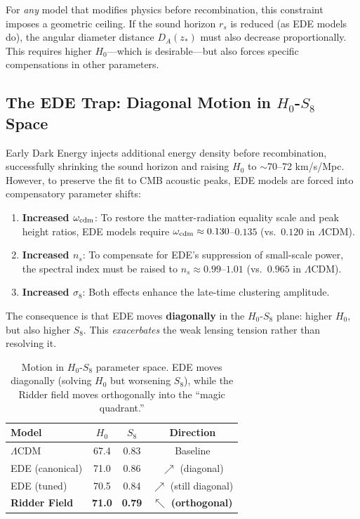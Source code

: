 \documentclass[twocolumn,showpacs,preprintnumbers,amsmath,amssymb,prd]{revtex4-2}
\begin{document}
For \textit{any} model that modifies physics before recombination, this constraint imposes a geometric ceiling. If the sound horizon $r_s$ is reduced (as EDE models do), the angular diameter distance $D_A(z_*)$ must also decrease proportionally. This requires higher $H_0$---which is desirable---but also forces specific compensations in other parameters.

\subsection{The EDE Trap: Diagonal Motion in $H_0$-$S_8$ Space}

Early Dark Energy injects additional energy density before recombination, successfully shrinking the sound horizon and raising $H_0$ to $\sim$70--72 km/s/Mpc. However, to preserve the fit to CMB acoustic peaks, EDE models are forced into compensatory parameter shifts:

\begin{enumerate}
    \item \textbf{Increased $\omega_{\rm cdm}$}: To restore the matter-radiation equality scale and peak height ratios, EDE models require $\omega_{\rm cdm} \approx 0.130$--$0.135$ (vs.\ $0.120$ in $\Lambda$CDM).
    
    \item \textbf{Increased $n_s$}: To compensate for EDE's suppression of small-scale power, the spectral index must be raised to $n_s \approx 0.99$--$1.01$ (vs.\ $0.965$ in $\Lambda$CDM).
    
    \item \textbf{Increased $\sigma_8$}: Both effects enhance the late-time clustering amplitude.
\end{enumerate}

The consequence is that EDE moves \textbf{diagonally} in the $H_0$-$S_8$ plane: higher $H_0$, but also higher $S_8$. This \textit{exacerbates} the weak lensing tension rather than resolving it.

\begin{table}[h]
\centering
\begin{tabular}{lccc}
\toprule
Model & $H_0$ & $S_8$ & Direction \\
\midrule
$\Lambda$CDM & 67.4 & 0.83 & Baseline \\
EDE (canonical) & 71.0 & 0.86 & $\nearrow$ (diagonal) \\
EDE (tuned) & 70.5 & 0.84 & $\nearrow$ (still diagonal) \\
\midrule
\textbf{Ridder Field} & \textbf{71.0} & \textbf{0.79} & $\nwarrow$ \textbf{(orthogonal)} \\
\bottomrule
\end{tabular}
\caption{Motion in $H_0$-$S_8$ parameter space. EDE moves diagonally (solving $H_0$ but worsening $S_8$), while the Ridder field moves orthogonally into the ``magic quadrant.''}
\label{tab:motion}
\end{table}
\end{document}
